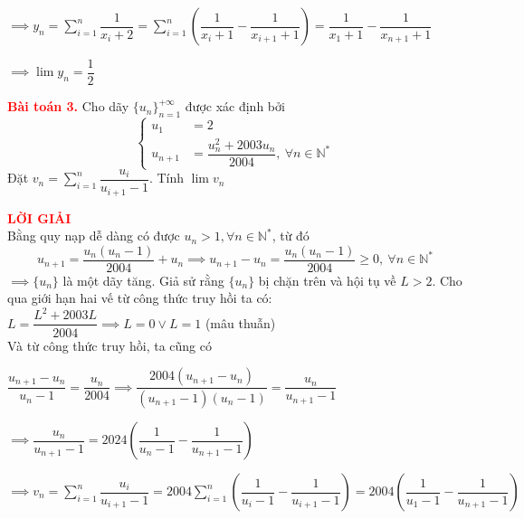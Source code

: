 \documentclass[a4paper, 12pt]{article}
\numberwithin{equation}{section}
\begin{document}
	$\implies y_n = \sum\limits_{i=1}^n \dfrac{1}{x_i + 2} = \sum\limits_{i=1}^n \left(\dfrac{1}{x_i + 1} - \dfrac{1}{x_{i+1} + 1} \right) = \dfrac{1}{x_1 + 1} - \dfrac{1}{x_{n+1} + 1}$
	
	$\implies \lim y_n = \dfrac{1}{2}$
    \newpage
    \begin{BoxRed}
	\textbf{\textcolor{red}{Bài toán 3.}}
		Cho dãy $\{ u_n \}_{n=1}^{+\infty}$ được xác định bởi 
	\[ \left\{
	\begin{aligned}
		u_1 &= 2 \\
		u_{n+1} &= \dfrac{u_n^2 + 2003 u_n}{2004}, \ \forall n \in \mathbb{N}^*
	\end{aligned}
	\right. \]
	Đặt $v_n = \sum\limits_{i=1}^n \dfrac{u_i}{u_{i+1} - 1}$. Tính $\lim v_n$
	\end{BoxRed}
	\textbf{\textcolor{red}{LỜI GIẢI}} \\
    Bằng quy nạp dễ dàng có được $u_n > 1, \forall n \in \mathbb{N}^*$, từ đó
	$$ u_{n+1} = \dfrac{u_n (u_n - 1)}{2004} + u_n \implies u_{n+1} - u_n = \dfrac{u_n (u_n - 1)}{2004} \geq 0, \ \forall n \in \mathbb{N}^*$$
	$\implies \{u_n\}$ là một dãy tăng. Giả sử rằng $\{u_n\}$ bị chặn trên và hội tụ về $L > 2$. Cho qua giới hạn hai vế từ công thức truy hồi ta có: \\
	$ L = \dfrac{L^2 + 2003L}{2004} \implies L = 0 \lor L = 1$ (mâu thuẫn)\\
	Và từ công thức truy hồi, ta cũng có
	
	$ \dfrac{u_{n+1} - u_n}{u_n - 1} = \dfrac{u_n}{2004} \implies \dfrac{2004\left(u_{n+1} - u_n\right)}{\left(u_{n+1} - 1 \right)\left(u_n - 1 \right)} = \dfrac{u_n}{u_{n+1} - 1}$
	
	$\implies \dfrac{u_n}{u_{n+1} - 1} = 2024\left(\dfrac{1}{u_n - 1} - \dfrac{1}{u_{n+1} - 1} \right)$
	
	$\implies v_n = \sum\limits_{i=1}^n \dfrac{u_i}{u_{i+1} - 1} = 2004 \sum\limits_{i=1}^n \left(\dfrac{1}{u_i - 1} - \dfrac{1}{u_{i+1} - 1} \right) = 2004\left(\dfrac{1}{u_1 - 1} - \dfrac{1}{u_{n+1} - 1} \right)$
	
\end{document}
